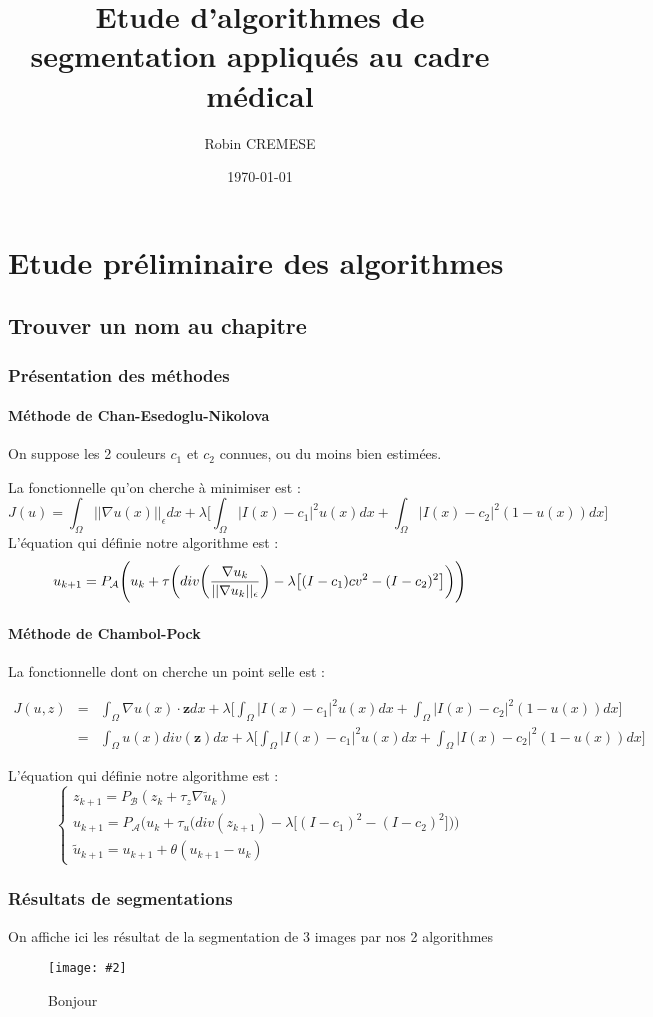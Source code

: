 \documentclass{report}
\title{Etude d'algorithmes de segmentation appliqués au cadre médical}
\author{Robin CREMESE}
\date{\today}
\newcommand{\image}[3][0.8]{
\begin{figure}[h]
\centering
\texttt{[image: \#2]}
\caption{#3}
\label{Fig-#2}
\end{figure}}
\begin{document}
\layout
\part{Etude préliminaire des algorithmes}
\label{P-Etude préliminaire des algorithmes}
\chapter{Trouver un nom au chapitre}
\section{Présentation des méthodes}
\label{S-Présentation des méthodes}
\subsection{Méthode de Chan-Esedoglu-Nikolova}
\label{SS-Méthode CEN}
On suppose les 2 couleurs $c_1$ et $c_2$ connues, ou du moins bien estimées.

La fonctionnelle qu'on cherche à minimiser est :
\begin{equation}
\label{Eq-J_CEN}
J(u)=\int_{\Omega}||\nabla u(x)||_{\epsilon}dx+\lambda\Big[\int_{\Omega}|I(x)-c_1|^2u(x)dx+
\int_{\Omega}|I(x)-c_2|^2(1-u(x))dx\Big]
\end{equation}
L'équation qui définie notre algorithme est :
\begin{equation}
\label{Eq-CEN}
	u_{k+1} =P_{\mathcal{A}}\Bigg(u_k+\tau \bigg(div\bigg(\frac{\nabla u_k}
	{||\nabla u_k||_{\epsilon}}\bigg)-\lambda \big[(I-c_1)cv ^2-(I-c_2)^2\big]\bigg)\Bigg)\\
\end{equation}
\subsection{Méthode de Chambol-Pock}
\label{SS-Méthode CP}
La fonctionnelle dont on cherche un point selle est :

\begin{eqnarray}
\label{Eq-J_CP}
		J(u,z)& =&\int_{\Omega}\nabla u(x)\cdot \textbf{z}dx+\lambda\Big[\int_{\Omega}|I(x)-c_1|^2u(x)dx+
\int_{\Omega}|I(x)-c_2|^2(1-u(x))dx\Big]\\
	&=& \int_{\Omega}u(x)div(\textbf{z})dx+\lambda\Big[\int_{\Omega}|I(x)-c_1|^2u(x)dx+
\int_{\Omega}|I(x)-c_2|^2(1-u(x))dx\Big]
\end{eqnarray}


L'équation qui définie notre algorithme est :
\begin{equation}
\label{Eq-CP}
	\begin{cases}
	z_{k+1} = P_{\mathcal{B}}(z_k+\tau_z \nabla \tilde{u}_k)\\
	
	u_{k+1} =P_{\mathcal{A}}\Big(u_k+\tau_u \big(div(z_{k+1})-\lambda \big[(I-c_1)^2-(I-c_2)^2\big]\big)\Big)\\

	\tilde{u}_{k+1}=u_{k+1}+\theta (u_{k+1}-u_k)
	\end{cases}
\end{equation}
\section{Résultats de segmentations}
\label{S-Résultats de segmentations}
On affiche ici les résultat de la segmentation de 3 images par nos 2 algorithmes
\image[1]{Square}{Bonjour}
\end{document}

